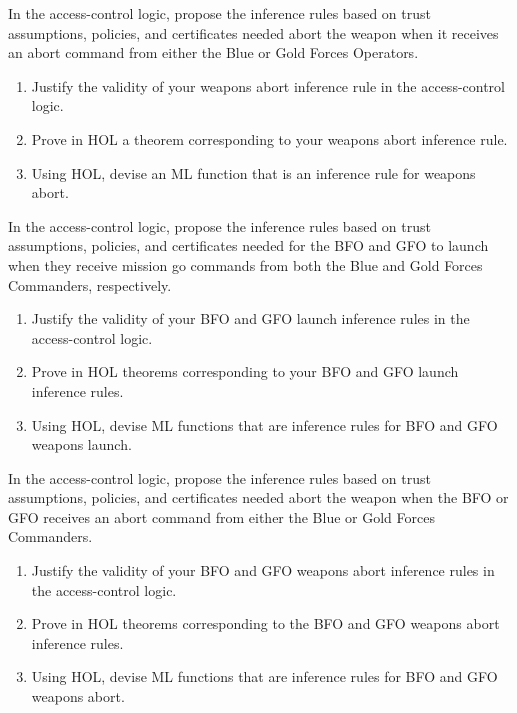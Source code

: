 \begin{exercise}[\synthesis]
  In the access-control logic, propose the inference rules based on
  trust assumptions, policies, and certificates needed abort the
  weapon when it receives an abort command from either the Blue or
  Gold Forces Operators.
  \begin{enumerate}[{A.}]
  \item Justify the validity of your weapons abort inference rule in
    the access-control logic.
  \item Prove in HOL a theorem corresponding to your weapons abort
    inference rule.
  \item Using HOL, devise an ML function that is an inference rule for
    weapons abort.
  \end{enumerate}
\end{exercise}

\begin{exercise}[\synthesis]
  In the access-control logic, propose the inference rules based on
  trust assumptions, policies, and certificates needed for the BFO and GFO
  to launch when they receive mission go commands from both the Blue and
  Gold Forces Commanders, respectively.
  \begin{enumerate}[{A.}]
  \item Justify the validity of your BFO and GFO launch inference rules in
    the access-control logic.
  \item Prove in HOL theorems corresponding to your BFO and GFO launch
    inference rules.
  \item Using HOL, devise ML functions that are inference rules for
    BFO and GFO weapons launch.
  \end{enumerate}
\end{exercise}

\begin{exercise}[\synthesis]
  In the access-control logic, propose the inference rules based on
  trust assumptions, policies, and certificates needed abort the
  weapon when the BFO or GFO receives an abort command from either the Blue or
  Gold Forces Commanders.
  \begin{enumerate}[{A.}]
  \item Justify the validity of your BFO and GFO weapons abort
    inference rules in the access-control logic.
  \item Prove in HOL theorems corresponding to the BFO and GFO weapons
    abort inference rules.
  \item Using HOL, devise ML functions that are inference rules for
    BFO and GFO weapons abort.
  \end{enumerate}
\end{exercise}



